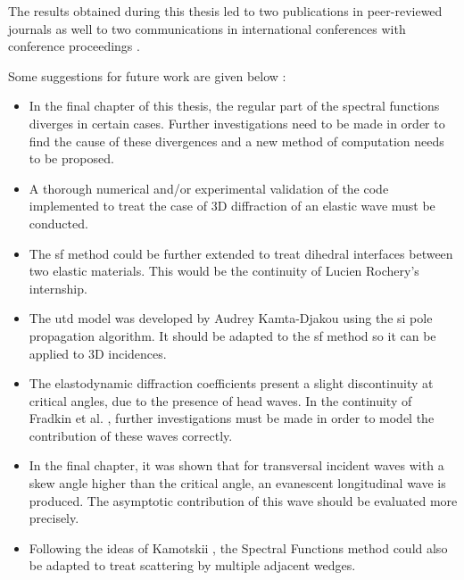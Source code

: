 The results obtained during this thesis led to two publications in peer-reviewed journals \cite{article, articleelasto} as well to two communications in international conferences with conference proceedings \cite{DD2018,AFPAC}.

Some suggestions for future work are given below :
\begin{itemize}
\item In the final chapter of this thesis, the regular part of the spectral functions diverges in certain cases. Further investigations need to be made in order to find the cause of these divergences and a new method of computation needs to be proposed.
\item A thorough numerical and/or experimental validation of the code implemented to treat the case of 3D diffraction of an elastic wave must be conducted.
\item The \acrlong{sf} method could be further extended to treat dihedral interfaces between two elastic materials. This would be the continuity of Lucien Rochery's internship.
\item The \acrshort{utd} model was developed by Audrey Kamta-Djakou \cite{AKDthese} using the \acrfull{si} pole propagation algorithm. It should be adapted to the \acrshort{sf} method so it can be applied to 3D incidences.
\item The elastodynamic diffraction coefficients present a slight discontinuity at critical angles, due to the presence of head waves. In the continuity of Fradkin et al. \cite{FradkinDarmon}, further investigations must be made in order to model the contribution of these waves correctly.
\item In the final chapter, it was shown that for transversal incident waves with a skew angle higher than the critical angle, an evanescent longitudinal wave is produced. The asymptotic contribution of this wave should be evaluated more precisely.
\item Following the ideas of Kamotskii \cite{Kamotski2}, the Spectral Functions method could also be adapted to treat scattering by multiple adjacent wedges.
\end{itemize}